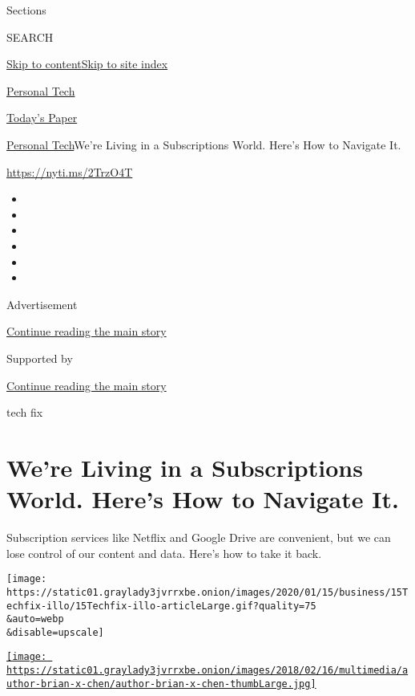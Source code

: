 Sections

SEARCH

\protect\hyperlink{site-content}{Skip to
content}\protect\hyperlink{site-index}{Skip to site index}

\href{https://www.nytimes3xbfgragh.onion/section/technology/personaltech}{Personal
Tech}

\href{https://myaccount.nytimes3xbfgragh.onion/auth/login?response_type=cookie\&client_id=vi}{}

\href{https://www.nytimes3xbfgragh.onion/section/todayspaper}{Today's
Paper}

\href{/section/technology/personaltech}{Personal Tech}\textbar{}We're
Living in a Subscriptions World. Here's How to Navigate It.

\href{https://nyti.ms/2TrzO4T}{https://nyti.ms/2TrzO4T}

\begin{itemize}
\item
\item
\item
\item
\item
\item
\end{itemize}

Advertisement

\protect\hyperlink{after-top}{Continue reading the main story}

Supported by

\protect\hyperlink{after-sponsor}{Continue reading the main story}

tech fix

\hypertarget{were-living-in-a-subscriptions-world-heres-how-to-navigate-it}{%
\section{We're Living in a Subscriptions World. Here's How to Navigate
It.}\label{were-living-in-a-subscriptions-world-heres-how-to-navigate-it}}

Subscription services like Netflix and Google Drive are convenient, but
we can lose control of our content and data. Here's how to take it back.

\texttt{[image: https://static01.graylady3jvrrxbe.onion/images/2020/01/15/business/15Techfix-illo/15Techfix-illo-articleLarge.gif?quality=75\\\&auto=webp\\\&disable=upscale]}

\href{https://www.nytimes3xbfgragh.onion/by/brian-x-chen}{\texttt{[image: https://static01.graylady3jvrrxbe.onion/images/2018/02/16/multimedia/author-brian-x-chen/author-brian-x-chen-thumbLarge.jpg]}}


